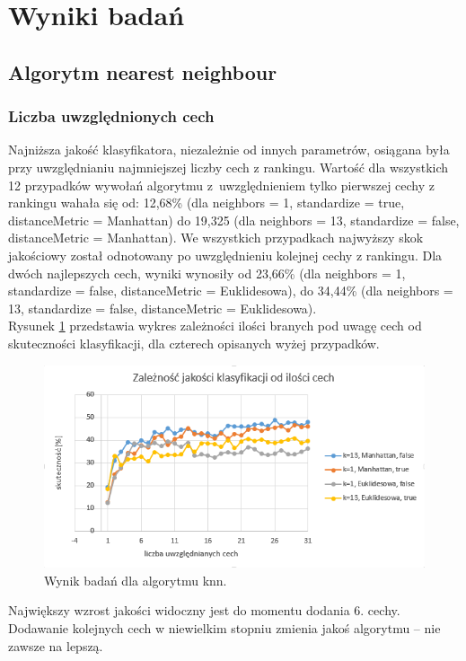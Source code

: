 \documentclass[11pt, a4paper, titlepage]{report}
\begin{document}
\section{Wyniki badań}
\label{chap:Wyniki badań}
\subsection{Algorytm nearest neighbour}
\label{subs:Algorytm nearest neighbour}
\subsubsection{Liczba uwzględnionych cech}
\label{subs:Liczba uwzględnionych cech}
Najniższa jakość klasyfikatora, niezależnie od innych parametrów, osiągana była przy uwzględnianiu najmniejszej liczby cech z rankingu. Wartość dla wszystkich 12 przypadków wywołań algorytmu z uwzględnieniem tylko pierwszej cechy z rankingu wahała się od: 12,68\% (dla neighbors = 1, standardize = true, distanceMetric = Manhattan) do 19,325 (dla neighbors = 13, standardize = false, distanceMetric = Manhattan).
We wszystkich przypadkach najwyższy skok jakościowy został odnotowany po uwzględnieniu kolejnej cechy z rankingu. Dla dwóch najlepszych cech, wyniki wynosiły od 23,66\% (dla neighbors = 1, standardize = false, distanceMetric = Euklidesowa), do 34,44\% (dla neighbors = 13, standardize = false, distanceMetric = Euklidesowa).\\

Rysunek \ref{fig:knn_res} przedstawia wykres zależności ilości branych pod uwagę cech od skuteczności klasyfikacji, dla czterech opisanych wyżej przypadków.
\begin{figure}[h]
  \centering
  \label{fig:knn_res}
  \includegraphics[scale=0.8]{obrazki/knn_plot}
  \caption{Wynik badań dla algorytmu knn.}
\end{figure}
Największy wzrost jakości widoczny jest do momentu dodania 6. cechy. Dodawanie kolejnych cech w niewielkim stopniu zmienia jakoś algorytmu – nie zawsze na lepszą.
\end{document}
